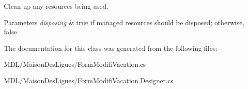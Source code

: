 Clean up any resources being used. 


\begin{DoxyParams}{Parameters}
{\em disposing} & true if managed resources should be disposed; otherwise, false.\\
\hline
\end{DoxyParams}


The documentation for this class was generated from the following files\+:\begin{DoxyCompactItemize}
\item 
M\+D\+L/\+Maison\+Des\+Ligues/Form\+Modifi\+Vacation.\+cs\item 
M\+D\+L/\+Maison\+Des\+Ligues/Form\+Modifi\+Vacation.\+Designer.\+cs\end{DoxyCompactItemize}

